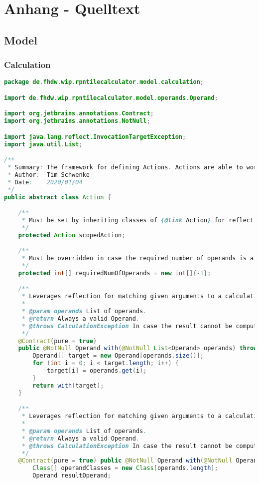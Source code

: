 
\section{Anhang - Quelltext}

\subsection{Model}

\subsubsection{Calculation}

\begin{lstlisting}[caption=Action (Schwenke),label=list:Action,language=Java]
package de.fhdw.wip.rpntilecalculator.model.calculation;

import de.fhdw.wip.rpntilecalculator.model.operands.Operand;

import org.jetbrains.annotations.Contract;
import org.jetbrains.annotations.NotNull;

import java.lang.reflect.InvocationTargetException;
import java.util.List;

/**
 * Summary: The framework for defining Actions. Actions are able to work with operands from the stack or executor functions.
 * Author:  Tim Schwenke
 * Date:    2020/01/04
 */
public abstract class Action {

    /**
     * Must be set by inheriting classes of {@link Action} for reflection to work.
     */
    protected Action scopedAction;

    /**
     * Must be overridden in case the required number of operands is a fixed amount.
     */
    protected int[] requiredNumOfOperands = new int[]{-1};

    /**
     * Leverages reflection for matching given arguments to a calculation method.
     *
     * @param operands List of operands.
     * @return Always a valid Operand.
     * @throws CalculationException In case the result cannot be computed.
     */
    @Contract(pure = true)
    public @NotNull Operand with(@NotNull List<Operand> operands) throws CalculationException {
        Operand[] target = new Operand[operands.size()];
        for (int i = 0; i < target.length; i++) {
            target[i] = operands.get(i);
        }
        return with(target);
    }

	/**
     * Leverages reflection for matching given arguments to a calculation method.
     *
     * @param operands List of operands.
     * @return Always a valid Operand.
     * @throws CalculationException In case the result cannot be computed.
     */
    @Contract(pure = true) public @NotNull Operand with(@NotNull Operand... operands) throws CalculationException {
        Class[] operandClasses = new Class[operands.length];
        Operand resultOperand;


\end{lstlisting}
